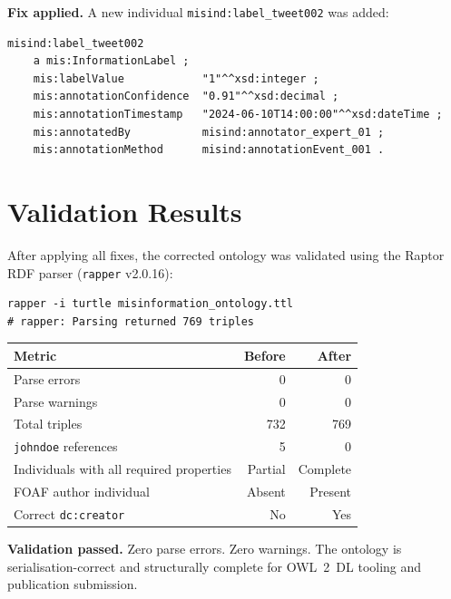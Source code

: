 \documentclass[11pt, a4paper]{article}
\newcommand{\ind}[1]{\texttt{misind:#1}}
\begin{document}
\textbf{Fix applied.} A new individual \ind{label\_tweet002} was added:
\begin{lstlisting}
misind:label_tweet002
    a mis:InformationLabel ;
    mis:labelValue            "1"^^xsd:integer ;
    mis:annotationConfidence  "0.91"^^xsd:decimal ;
    mis:annotationTimestamp   "2024-06-10T14:00:00"^^xsd:dateTime ;
    mis:annotatedBy           misind:annotator_expert_01 ;
    mis:annotationMethod      misind:annotationEvent_001 .
\end{lstlisting}

\section{Validation Results}

After applying all fixes, the corrected ontology was validated using the
Raptor RDF parser (\texttt{rapper} v2.0.16):

\begin{lstlisting}
rapper -i turtle misinformation_ontology.ttl
# rapper: Parsing returned 769 triples
\end{lstlisting}

\vspace{4pt}
\begin{center}
\renewcommand{\arraystretch}{1.3}
\begin{tabular}{@{} l r r @{}}
\rowcolor{cair-light}
\textbf{Metric} & \textbf{Before} & \textbf{After} \\
\midrule
Parse errors                  & 0    & 0 \\
\rowcolor{row-alt}
Parse warnings                & 0    & 0 \\
Total triples                 & 732  & 769 \\
\rowcolor{row-alt}
\texttt{johndoe} references   & 5    & 0 \\
Individuals with all required properties & Partial & Complete \\
\rowcolor{row-alt}
FOAF author individual        & Absent & Present \\
Correct \texttt{dc:creator}   & No   & Yes \\
\end{tabular}
\end{center}

\begin{criticalbox}
\textbf{\faCheckCircle\quad Validation passed.}
Zero parse errors. Zero warnings. The ontology is serialisation-correct
and structurally complete for OWL~2~DL tooling and publication submission.
\end{criticalbox}
\end{document}
